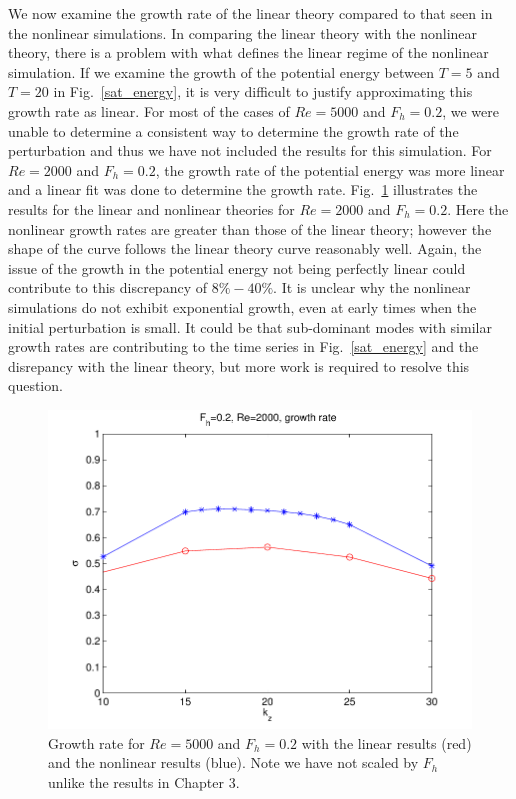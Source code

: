 We now examine the growth rate of the linear theory compared to that seen in the nonlinear simulations. In comparing the linear theory with the nonlinear theory, there is a problem with what defines the linear regime of the nonlinear simulation. If we examine the growth of the potential energy between $T=5$ and $T=20$ in Fig.~\ref{sat_energy}, it is very difficult to justify approximating this growth rate as linear. For most of the cases of $Re=5000$ and $F_{h}=0.2$, we were unable to determine a consistent way to determine the growth rate of the perturbation and thus we have not included the results for this simulation. For $Re=2000$ and $F_{h}=0.2$, the growth rate of the potential energy was more linear and a linear fit was done to determine the growth rate. Fig.~\ref{growth_rates_nonlinear} illustrates the results for the linear and nonlinear theories for $Re=2000$ and $F_{h}=0.2$. Here the nonlinear growth rates are greater than those of the linear theory; however the shape of the curve follows the linear theory curve reasonably well. Again, the issue of the growth in the potential energy not being perfectly linear could contribute to this discrepancy of $8\%-40\%$. It is unclear why the nonlinear simulations do not exhibit exponential growth, even at early times when the initial perturbation is small. It could be that sub-dominant modes with similar growth rates are contributing to the time series in Fig.~\ref{sat_energy} and the disrepancy with the linear theory, but more work is required to resolve this question. 

\begin{figure}
\begin{center}
\includegraphics[width=\textwidth]{re2000_fh02_growth_rates} 
\caption{Growth rate for $Re=5000$ and $F_{h}=0.2$ with the linear results (red) and the nonlinear results (blue). Note we have not scaled by $F_{h}$ unlike the results in Chapter 3.}
\label{growth_rates_nonlinear}
\end{center}
\end{figure}

